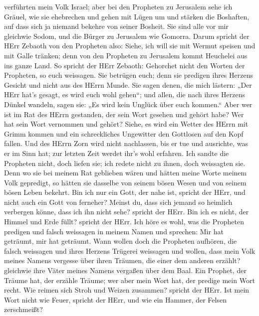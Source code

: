 verführten mein Volk Israel;  aber bei den Propheten zu
Jerusalem sehe ich Gräuel, wie sie ehebrechen und gehen mit Lügen um und
stärken die Boshaften, auf dass sich ja niemand bekehre von seiner
Bosheit. Sie sind alle vor mir gleichwie Sodom, und die Bürger zu
Jerusalem wie Gomorra.  Darum spricht der HErr Zebaoth von
den Propheten also: Siehe, ich will sie mit Wermut speisen und mit Galle
tränken; denn von den Propheten zu Jerusalem kommt Heuchelei aus ins
ganze Land.  So spricht der HErr Zebaoth: Gehorchet nicht
den Worten der Propheten, so euch weissagen. Sie betrügen euch; denn sie
predigen ihres Herzens Gesicht und nicht aus des HErrn Munde.
 Sie sagen denen, die mich lästern: „Der HErr hat's gesagt,
es wird euch wohl gehen``; und allen, die nach ihres Herzens Dünkel
wandeln, sagen sie: „Es wird kein Unglück über euch kommen.``
 Aber wer ist im Rat des HErrn gestanden, der sein Wort
gesehen und gehört habe? Wer hat sein Wort vernommen und gehört?
 Siehe, es wird ein Wetter des HErrn mit Grimm kommen und
ein schreckliches Ungewitter den Gottlosen auf den Kopf fallen.
 Und des HErrn Zorn wird nicht nachlassen, bis er tue und
ausrichte, was er im Sinn hat; zur letzten Zeit werdet ihr's wohl
erfahren.  Ich sandte die Propheten nicht, doch liefen sie;
ich redete nicht zu ihnen, doch weissagten sie.  Denn wo
sie bei meinem Rat geblieben wären und hätten meine Worte meinem Volk
gepredigt, so hätten sie dasselbe von seinem bösen Wesen und von seinem
bösen Leben bekehrt.  Bin ich nur ein Gott, der nahe ist,
spricht der HErr, und nicht auch ein Gott von ferneher? 
Meinst du, dass sich jemand so heimlich verbergen könne, dass ich ihn
nicht sehe? spricht der HErr. Bin ich es nicht, der Himmel und Erde
füllt? spricht der HErr.  Ich höre es wohl, was die
Propheten predigen und falsch weissagen in meinem Namen und sprechen:
Mir hat geträumt, mir hat geträumt.  Wann wollen doch die
Propheten aufhören, die falsch weissagen und ihres Herzens Trügerei
weissagen  und wollen, dass mein Volk meines Namens
vergesse über ihren Träumen, die einer dem anderen erzählt? gleichwie
ihre Väter meines Namens vergaßen über dem Baal.  Ein
Prophet, der Träume hat, der erzähle Träume; wer aber mein Wort hat, der
predige mein Wort recht. Wie reimen sich Stroh und Weizen zusammen?
spricht der HErr.  Ist mein Wort nicht wie Feuer, spricht
der HErr, und wie ein Hammer, der Felsen zerschmeißt? 
